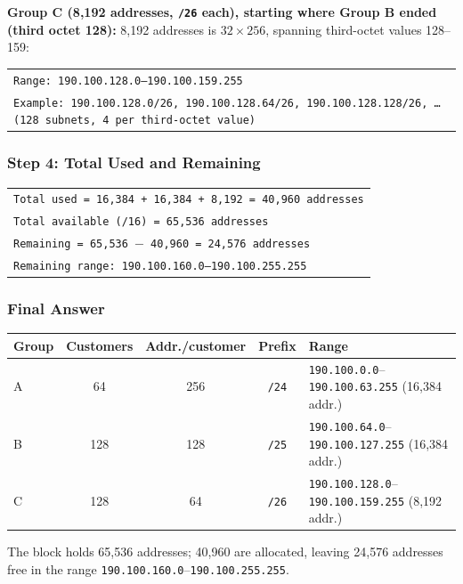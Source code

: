 \documentclass[11pt,a4paper]{article}
\begin{document}
\textbf{Group C (8,192 addresses, \texttt{/26} each), starting where Group B
ended (third octet 128):} 8,192 addresses is $32 \times 256$, spanning
third-octet values 128--159:

\begin{tabularx}{\textwidth}{@{}X@{}}
\texttt{Range: 190.100.128.0--190.100.159.255} \\
\texttt{Example: 190.100.128.0/26, 190.100.128.64/26, 190.100.128.128/26, \ldots{} (128 subnets, 4 per third-octet value)} \\
\end{tabularx}

\subsubsection*{Step 4: Total Used and Remaining}

\begin{tabularx}{\textwidth}{@{}X@{}}
\texttt{Total used = 16,384 + 16,384 + 8,192 = 40,960 addresses} \\
\texttt{Total available (/16) = 65,536 addresses} \\
\texttt{Remaining = 65,536 $-$ 40,960 = 24,576 addresses} \\
\texttt{Remaining range: 190.100.160.0--190.100.255.255} \\
\end{tabularx}

\subsubsection*{Final Answer}

\begin{tabularx}{\textwidth}{@{}lcccX@{}}
\toprule
\rowcolor{tablehead}\textbf{Group} & \textbf{Customers} & \textbf{Addr./customer} & \textbf{Prefix} & \textbf{Range} \\
\midrule
A & 64 & 256 & \texttt{/24} & \texttt{190.100.0.0}--\texttt{190.100.63.255} (16{,}384 addr.) \\
B & 128 & 128 & \texttt{/25} & \texttt{190.100.64.0}--\texttt{190.100.127.255} (16{,}384 addr.) \\
C & 128 & 64 & \texttt{/26} & \texttt{190.100.128.0}--\texttt{190.100.159.255} (8{,}192 addr.) \\
\bottomrule
\end{tabularx}

The block holds 65,536 addresses; 40,960 are allocated, leaving 24,576 addresses free in the
range \texttt{190.100.160.0}--\texttt{190.100.255.255}.
\end{document}

